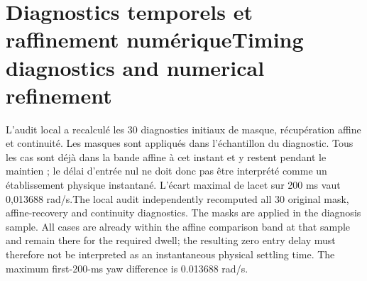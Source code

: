 \documentclass[11pt,a4paper,oneside]{report}
\newcommand{\bi}[2]{\iffrench #2\else #1\fi}
\renewcommand{\sec}[2]{\section{\bi{#1}{#2}}}
\begin{document}
\sec{Timing diagnostics and numerical refinement}{Diagnostics temporels et raffinement numérique}
\bi{The local audit independently recomputed all 30 original mask, affine-recovery and continuity diagnostics. The masks are applied in the diagnosis sample. All cases are already within the affine comparison band at that sample and remain there for the required dwell; the resulting zero entry delay must therefore not be interpreted as an instantaneous physical settling time. The maximum first-200-ms yaw difference is 0.013688 rad/s.}{L'audit local a recalculé les 30 diagnostics initiaux de masque, récupération affine et continuité. Les masques sont appliqués dans l'échantillon du diagnostic. Tous les cas sont déjà dans la bande affine à cet instant et y restent pendant le maintien ; le délai d'entrée nul ne doit donc pas être interprété comme un établissement physique instantané. L'écart maximal de lacet sur 200 ms vaut 0,013688 rad/s.}
\end{document}

